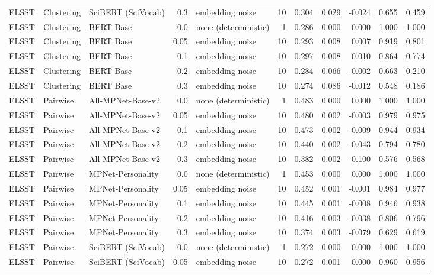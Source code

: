 \begin{table}[ht]
\begin{tabular}{lllrlrrrrrr}
ELSST & Clustering & SciBERT (SciVocab) & 0.3 & embedding noise & 10 & 0.304 & 0.029 & -0.024 & 0.655 & 0.459 \\
ELSST & Clustering & BERT Base & 0.0 & none (deterministic) & 1 & 0.286 & 0.000 & 0.000 & 1.000 & 1.000 \\
ELSST & Clustering & BERT Base & 0.05 & embedding noise & 10 & 0.293 & 0.008 & 0.007 & 0.919 & 0.801 \\
ELSST & Clustering & BERT Base & 0.1 & embedding noise & 10 & 0.297 & 0.008 & 0.010 & 0.864 & 0.774 \\
ELSST & Clustering & BERT Base & 0.2 & embedding noise & 10 & 0.284 & 0.066 & -0.002 & 0.663 & 0.210 \\
ELSST & Clustering & BERT Base & 0.3 & embedding noise & 10 & 0.274 & 0.086 & -0.012 & 0.548 & 0.186 \\
ELSST & Pairwise & All-MPNet-Base-v2 & 0.0 & none (deterministic) & 1 & 0.483 & 0.000 & 0.000 & 1.000 & 1.000 \\
ELSST & Pairwise & All-MPNet-Base-v2 & 0.05 & embedding noise & 10 & 0.480 & 0.002 & -0.003 & 0.979 & 0.975 \\
ELSST & Pairwise & All-MPNet-Base-v2 & 0.1 & embedding noise & 10 & 0.473 & 0.002 & -0.009 & 0.944 & 0.934 \\
ELSST & Pairwise & All-MPNet-Base-v2 & 0.2 & embedding noise & 10 & 0.440 & 0.002 & -0.043 & 0.794 & 0.780 \\
ELSST & Pairwise & All-MPNet-Base-v2 & 0.3 & embedding noise & 10 & 0.382 & 0.002 & -0.100 & 0.576 & 0.568 \\
ELSST & Pairwise & MPNet-Personality & 0.0 & none (deterministic) & 1 & 0.453 & 0.000 & 0.000 & 1.000 & 1.000 \\
ELSST & Pairwise & MPNet-Personality & 0.05 & embedding noise & 10 & 0.452 & 0.001 & -0.001 & 0.984 & 0.977 \\
ELSST & Pairwise & MPNet-Personality & 0.1 & embedding noise & 10 & 0.445 & 0.001 & -0.008 & 0.946 & 0.938 \\
ELSST & Pairwise & MPNet-Personality & 0.2 & embedding noise & 10 & 0.416 & 0.003 & -0.038 & 0.806 & 0.796 \\
ELSST & Pairwise & MPNet-Personality & 0.3 & embedding noise & 10 & 0.374 & 0.003 & -0.079 & 0.629 & 0.619 \\
ELSST & Pairwise & SciBERT (SciVocab) & 0.0 & none (deterministic) & 1 & 0.272 & 0.000 & 0.000 & 1.000 & 1.000 \\
ELSST & Pairwise & SciBERT (SciVocab) & 0.05 & embedding noise & 10 & 0.272 & 0.001 & 0.000 & 0.960 & 0.956 \\

\end{tabular}
\end{table}
